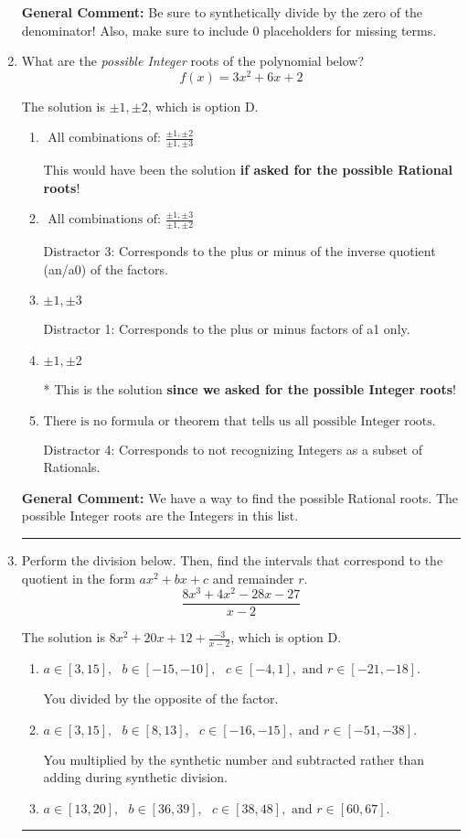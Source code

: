 \documentclass{extbook}[14pt]
\newcommand{\litem}[1]{\item #1

\rule{\textwidth}{0.4pt}}
\begin{document}
\begin{enumerate}
{\textbf{General Comment:} Be sure to synthetically divide by the zero of the denominator! Also, make sure to include 0 placeholders for missing terms.
}
\litem{
What are the \textit{possible Integer} roots of the polynomial below?
\[ f(x) = 3x^{2} +6 x + 2 \]

The solution is \( \pm 1,\pm 2 \), which is option D.\begin{enumerate}[label=\Alph*.]
\item \( \text{ All combinations of: }\frac{\pm 1,\pm 2}{\pm 1,\pm 3} \)

This would have been the solution \textbf{if asked for the possible Rational roots}!
\item \( \text{ All combinations of: }\frac{\pm 1,\pm 3}{\pm 1,\pm 2} \)

 Distractor 3: Corresponds to the plus or minus of the inverse quotient (an/a0) of the factors. 
\item \( \pm 1,\pm 3 \)

 Distractor 1: Corresponds to the plus or minus factors of a1 only.
\item \( \pm 1,\pm 2 \)

* This is the solution \textbf{since we asked for the possible Integer roots}!
\item \( \text{There is no formula or theorem that tells us all possible Integer roots.} \)

 Distractor 4: Corresponds to not recognizing Integers as a subset of Rationals.
\end{enumerate}

\textbf{General Comment:} We have a way to find the possible Rational roots. The possible Integer roots are the Integers in this list.
}
\litem{
Perform the division below. Then, find the intervals that correspond to the quotient in the form $ax^2+bx+c$ and remainder $r$.
\[ \frac{8x^{3} +4 x^{2} -28 x -27}{x -2} \]

The solution is \( 8x^{2} +20 x + 12 + \frac{-3}{x -2} \), which is option D.\begin{enumerate}[label=\Alph*.]
\item \( a \in [3, 15], \text{   } b \in [-15, -10], \text{   } c \in [-4, 1], \text{   and   } r \in [-21, -18]. \)

 You divided by the opposite of the factor.
\item \( a \in [3, 15], \text{   } b \in [8, 13], \text{   } c \in [-16, -15], \text{   and   } r \in [-51, -38]. \)

 You multiplied by the synthetic number and subtracted rather than adding during synthetic division.
\item \( a \in [13, 20], \text{   } b \in [36, 39], \text{   } c \in [38, 48], \text{   and   } r \in [60, 67]. \)


\end{enumerate}}
\end{enumerate}
\end{document}
